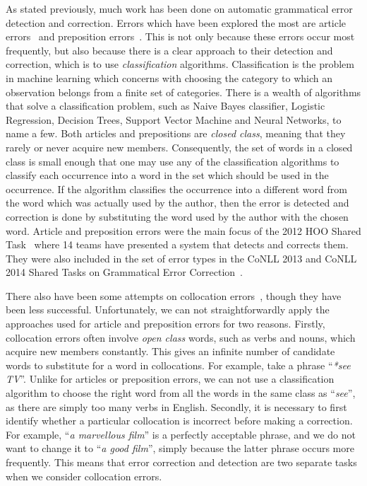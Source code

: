 \documentclass[11pt]{article}
\begin{document}
As stated previously, much work has been done on automatic grammatical error 
detection and correction. Errors which have been explored the most are article 
errors~\citep{han2006detecting, rozovskaya2010training, turner2007language, 
dahlmeier2011grammatical, de2008classifier} and preposition 
errors~\citep{bergsma2009web, tetreault2008ups, tetreault2010using, 
dahlmeier2011grammatical, de2008classifier, chodorow2007detection}.
This is not only because these errors occur most frequently, but also because there is a clear approach to their detection and correction, which is to use \emph{classification} algorithms.
Classification is the problem in machine learning which concerns with choosing the category to which an observation belongs from a finite set of categories.
There is a wealth of algorithms that solve a classification problem, such as Naive Bayes classifier, Logistic Regression, Decision Trees, Support Vector Machine and Neural Networks, to name a few.
Both articles and prepositions are \emph{closed class}, meaning that they rarely or never acquire new members.
Consequently, the set of words in a closed class is small enough that one may use any of the classification algorithms to classify each occurrence into a word in the set which should be used in the occurrence.
If the algorithm classifies the occurrence into a different word from the word which was actually used by the author,
then the error is detected and correction is done by substituting the word used by the author with the chosen word.
Article and preposition errors were the main focus of the 2012 HOO Shared Task~\citep{dale2012hoo} where 14 teams have 
presented a system that detects and corrects them.
They were also included in the set of error types in the CoNLL 2013 and CoNLL 2014 Shared Tasks on Grammatical Error Correction~\citep{CoNLLST:2013, ng2014conll}.

There also have been some attempts on collocation errors~\citep{shei2000esl, 
wible2003bootstrapping, futagi2008computational, liu2009automated}, though they have been less successful.
Unfortunately, we can not straightforwardly apply the approaches used for article and preposition errors for two reasons.
Firstly, collocation errors often involve \emph{open class} words, such as verbs and nouns, which acquire new members constantly. This gives an infinite number of candidate words to substitute for a word in collocations. For example, take a phrase ``\emph{*see TV}''. Unlike for articles or preposition errors, we can not use a classification algorithm to choose the right word from all the words in the same class as ``\emph{see}'', as there are simply too many verbs in English.
Secondly, it is necessary to first identify whether a particular collocation is incorrect before making a correction. For example, ``\emph{a marvellous film}'' is a perfectly acceptable phrase, and we do not want to change it to ``\emph{a good film}'', simply because the latter phrase occurs more frequently. This means that error correction and detection are two separate 
tasks when we consider collocation errors.
 
\end{document}

